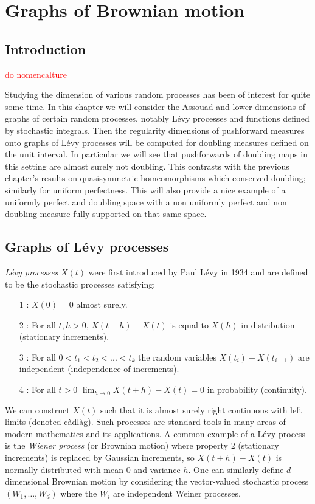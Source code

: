\chapter{Graphs of Brownian motion}
\label{chap:graphs}

\section{Introduction}
\label{sec:intro-brownian}

\textcolor{red}{do nomencalture}

Studying the dimension of various random processes has been of interest for quite some time. In this chapter we will consider the Assouad and lower dimensions of graphs of certain random processes, notably L\'evy processes and functions defined by stochastic integrals. Then the regularity dimensions of pushforward measures onto graphs of L\'evy processes will be computed for doubling measures defined on the unit interval. In particular we will see that pushforwards of doubling maps in this setting are almost surely not doubling. This contrasts with the previous chapter's results on quasisymmetric homeomorphisms which conserved doubling; similarly for uniform perfectness. This will also provide a nice example of a uniformly perfect and doubling space with a non uniformly perfect and non doubling measure fully supported on that same space.


\section{Graphs of L\'evy processes}
\label{sec:levy-process}


\emph{L\'{e}vy processes} $X(t)$ were first introduced by Paul L\'evy in 1934 \cite{levy} and are defined to be the stochastic processes satisfying:
\begin{itemize}
	\item[1]: $X(0)=0$ almost surely.
	\item[2]: For all $t,h>0$, $X(t+h)-X(t)$ is equal to $X(h)$ in distribution (stationary increments).
	\item[3]: For all $0<t_1<t_2<...<t_k$ the random variables $X(t_i)-X(t_{i-1})$ are independent (independence of increments).
	\item[4]: For all $t>0$ $\lim_{h\to 0} X(t+h)-X(t)=0$ in probability (continuity).
\end{itemize}

We can construct $X(t)$ such that it is almost surely right continuous with left limits (denoted c\`adl\`ag). Such processes are standard tools in many areas of modern mathematics and its applications. A common example of a L\'evy process is the \emph{Wiener process} (or Brownian motion) where property 2 (stationary increments) is replaced by Gaussian increments, so $X(t+h)-X(t)$ is normally distributed with mean 0 and variance $h$. One can similarly define $d$-dimensional Brownian motion by considering the vector-valued stochastic process $(W_1,\ldots, W_d)$ where the $W_i$ are independent Weiner processes. 


